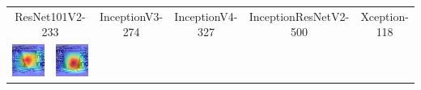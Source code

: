 \begin{landscape}
\begin{table}[]
\begin{tabular}{@{}c c c c c c c c c c@{}}
			\multicolumn{2}{c}{ResNet101V2-233} & \multicolumn{2}{c}{InceptionV3-274} & \multicolumn{2}{c}{InceptionV4-327} & \multicolumn{2}{c}{InceptionResNetV2-500} & \multicolumn{2}{c}{Xception-118}\\
			\includegraphics[width=.12\textheight ,keepaspectratio]{images/pretraining/gradcam/3/ResNet101V2CombinedGradCam.png} &
			\includegraphics[width=.12\textheight ,keepaspectratio]{images/pretraining/gradcam/9/ResNet101V2CombinedGradCam.png} &

\end{tabular}
\end{table}
\end{landscape}
